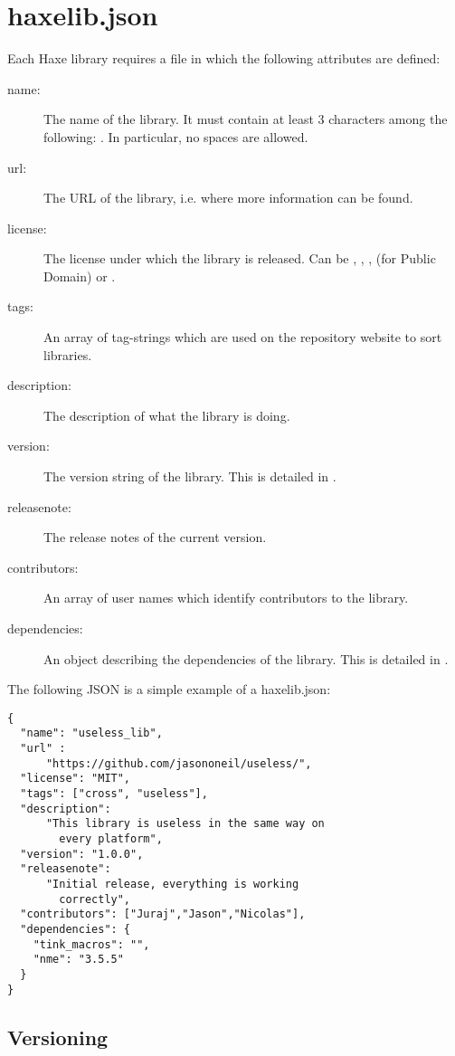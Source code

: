 \section{haxelib.json}
\label{haxelib-json}

Each Haxe library requires a  file in which the following attributes are defined:

\begin{description}
	\item[name:] The name of the library. It must contain at least 3 characters among the following: \ic{\[A-Za-z0-9_-.\]}. In particular, no spaces are allowed.
	\item[url:] The URL of the library, i.e. where more information can be found.
	\item[license:] The license under which the library is released. Can be , , ,  (for Public Domain) or .
	\item[tags:] An array of tag-strings which are used on the repository website to sort libraries.
	\item[description:] The description of what the library is doing.
	\item[version:] The version string of the library. This is detailed in .
	\item[releasenote:] The release notes of the current version.
	\item[contributors:] An array of user names which identify contributors to the library. 
	\item[dependencies:] An object describing the dependencies of the library. This is detailed in .
\end{description}

The following JSON is a simple example of a haxelib.json:

\begin{lstlisting}
{
  "name": "useless_lib",
  "url" :
	  "https://github.com/jasononeil/useless/",
  "license": "MIT",
  "tags": ["cross", "useless"],
  "description":
	  "This library is useless in the same way on
		every platform",
  "version": "1.0.0",
  "releasenote":
	  "Initial release, everything is working
		correctly",
  "contributors": ["Juraj","Jason","Nicolas"],
  "dependencies": {
    "tink_macros": "",
    "nme": "3.5.5"
  }
}
\end{lstlisting}

\subsection{Versioning}
\label{haxelib-json-versioning}

